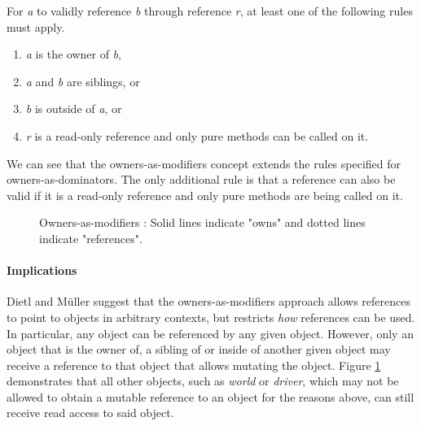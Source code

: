 \documentclass[sigplan,11pt,nonacm]{acmart}
\begin{document}
For \emph{a} to validly reference \emph{b} through reference \emph{r}, at least one of the following rules \cite{ownership-types-survey} must apply.
\begin{enumerate}
  \item \emph{a} is the owner of \emph{b},
  \item \emph{a} and \emph{b} are siblings, or
  \item \emph{b} is outside of \emph{a}, or
  \item \emph{r} is a read-only reference and only pure methods can be called on it.
\end{enumerate}
We can see that the owners-as-modifiers concept extends the rules specified for owners-as-dominators.
The only additional rule is that a reference can also be valid if it is a read-only reference and only pure methods are being called on it.

\begin{figure}

  \caption{Owners-as-modifiers \cite{ownership-types-survey}: Solid lines indicate "owns" and dotted lines indicate "references".}
  \label{fig:owners-as-modifiers}
\end{figure}

\paragraph{Implications}

Dietl and Müller \cite{lightweight-ownership} suggest that the owners-as-modifiers approach allows references to point to objects in arbitrary contexts, but restricts \emph{how} references can be used.
In particular, any object can be referenced by any given object.
However, only an object that is the owner of, a sibling of or inside of another given object may receive a reference to that object that allows mutating the object.
Figure \ref{fig:owners-as-modifiers} demonstrates that all other objects, such as \emph{world} or \emph{driver}, which may not be allowed to obtain a mutable reference to an object for the reasons above, can still receive read access to said object.
\end{document}
